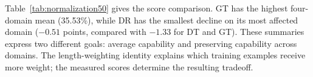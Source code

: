 Table~\ref{tab:normalization50} gives the score comparison. GT has the highest four-domain mean (35.53\%), while DR has the smallest decline on its most affected domain ($-0.51$ points, compared with $-1.33$ for DT and GT). These summaries express two different goals: average capability and preserving capability across domains. The length-weighting identity explains which training examples receive more weight; the measured scores determine the resulting tradeoff.

\begin{table}[t]
\caption{Capability scores (\%) at update 50. Mean averages the four domain scores. Worst $\Delta$ is the smallest domain change from initialization, in percentage points.}
\label{tab:normalization50}
\centering\small

\end{table}

